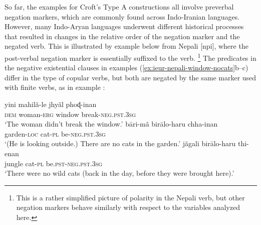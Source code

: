 ﻿\documentclass[output=paper]{langsci/langscibook}
\begin{document}
So far, the examples for Croft's Type A constructions all involve preverbal
negation markers, which are commonly found across Indo-Iranian languages.
However, many Indo-Aryan languages underwent different historical processes
that resulted in changes in the relative order of the negation marker and
the negated verb. This is illustrated by example  below
from Nepali [npi], where the post-verbal negation marker is essentially
suffixed to the verb.%
%
\footnote{This is a rather simplified picture of
polarity in the Nepali verb, but other negation markers behave similarly
with respect to the variables analyzed here.} 
%
The predicates in the negative existential clauses in examples
(\ref{ex:ieur-nepali-window-nocats}b--c) differ in the type of
copular verbs, but both are negated by the same marker used with finite
verbs, as in example : 
%
\begin{exe}\ex\label{ex:ieur-nepali-window-nocats}
\begin{xlist}
\ex\label{ex:ieur-nepali-window}
    \gll yini  mahilã-le jhyãl phoɖ-inan\\
  \textsc{dem} woman-\textsc{erg} window  break-\textsc{neg.pst.3sg} \\
    \glt `The woman didn't break the window.'
\ex
\gll bāri-mã       birālo-haru  chha-inan \\
garden-\textsc{loc} cat-\textsc{pl} be-\textsc{neg.pst.3sg}\\
\glt `(He is looking outside.) There are no cats in the garden.'
\ex
\gll jãgali  birālo-haru  thi-enan\\ 
jungle cat-\textsc{pl}
be.\textsc{pst}-\textsc{neg}.\textsc{pst}.\textsc{3sg}\\ 
\glt `There were no wild cats (back in the day, before they were brought
here).'
\end{xlist}\end{exe}
\end{document}
